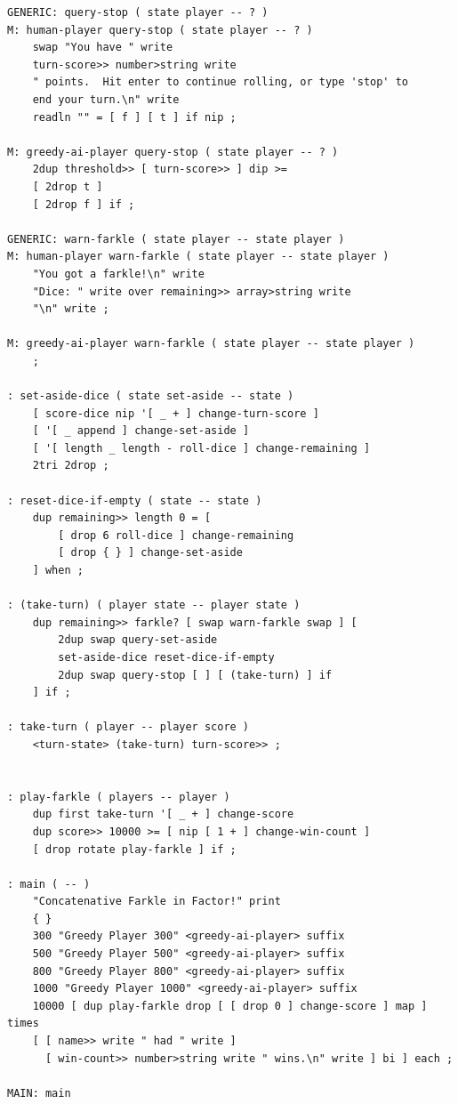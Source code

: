 \documentclass{article}
\begin{document}
\begin{lstlisting}
GENERIC: query-stop ( state player -- ? )
M: human-player query-stop ( state player -- ? )
    swap "You have " write
    turn-score>> number>string write
    " points.  Hit enter to continue rolling, or type 'stop' to
    end your turn.\n" write
    readln "" = [ f ] [ t ] if nip ;

M: greedy-ai-player query-stop ( state player -- ? )
    2dup threshold>> [ turn-score>> ] dip >=
    [ 2drop t ]
    [ 2drop f ] if ;

GENERIC: warn-farkle ( state player -- state player )
M: human-player warn-farkle ( state player -- state player )
    "You got a farkle!\n" write
    "Dice: " write over remaining>> array>string write
    "\n" write ;

M: greedy-ai-player warn-farkle ( state player -- state player )
    ;

: set-aside-dice ( state set-aside -- state )
    [ score-dice nip '[ _ + ] change-turn-score ]
    [ '[ _ append ] change-set-aside ]
    [ '[ length _ length - roll-dice ] change-remaining ]
    2tri 2drop ;

: reset-dice-if-empty ( state -- state )
    dup remaining>> length 0 = [
        [ drop 6 roll-dice ] change-remaining
        [ drop { } ] change-set-aside
    ] when ;

: (take-turn) ( player state -- player state )
    dup remaining>> farkle? [ swap warn-farkle swap ] [
        2dup swap query-set-aside
        set-aside-dice reset-dice-if-empty
        2dup swap query-stop [ ] [ (take-turn) ] if
    ] if ;

: take-turn ( player -- player score ) 
    <turn-state> (take-turn) turn-score>> ;


: play-farkle ( players -- player ) 
    dup first take-turn '[ _ + ] change-score
    dup score>> 10000 >= [ nip [ 1 + ] change-win-count ]
    [ drop rotate play-farkle ] if ;

: main ( -- )
    "Concatenative Farkle in Factor!" print
    { }
    300 "Greedy Player 300" <greedy-ai-player> suffix
    500 "Greedy Player 500" <greedy-ai-player> suffix
    800 "Greedy Player 800" <greedy-ai-player> suffix
    1000 "Greedy Player 1000" <greedy-ai-player> suffix
    10000 [ dup play-farkle drop [ [ drop 0 ] change-score ] map ] times
    [ [ name>> write " had " write ]
      [ win-count>> number>string write " wins.\n" write ] bi ] each ;

MAIN: main
\end{lstlisting}
\end{document}
